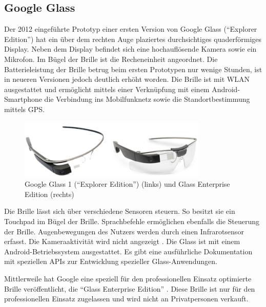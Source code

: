 \subsection{Google Glass}
\label{sec:Google_Glass}
Der 2012 eingeführte Prototyp einer ersten Version von Google Glass (\enquote{Explorer Edition}) hat ein über dem rechten Auge plaziertes durchsichtiges quaderförmiges Display. Neben dem Display befindet sich eine hochauflösende Kamera sowie ein Mikrofon. Im Bügel der Brille ist die Recheneinheit angeordnet. Die Batterieleistung der Brille betrug beim ersten Prototypen nur wenige Stunden, ist in neueren Versionen jedoch deutlich erhöht worden. Die Brille ist mit WLAN ausgestattet und ermöglicht mittels einer Verknüpfung mit einem Android-Smartphone die Verbindung ins Mobilfunknetz sowie die Standortbestimmung mittels GPS.
%
\begin{figure}[htbp]
    \centering
    \includegraphics[width=0.8\textwidth]{data/bilder/Glass_1_und_2.png}
    \caption{Google Glass 1 (\enquote{Explorer Edition}) \cite{Reckmann2014a} (links) und Glass Enterprise Edition \cite{Huvelin2017} (rechts)}
    \label{fig:GlassModel}
\end{figure}
%

Die Brille lässt sich über verschiedene Sensoren steuern. So besitzt sie ein Touchpad im Bügel der Brille. Sprachbefehle ermöglichen ebenfalls die Steuerung der Brille. Augenbewegungen des Nutzers werden durch einen Infrarotsensor erfasst. Die Kameraaktivität wird nicht angezeigt \cite[S.~30]{Schwenke2016}. Die Glass ist mit einem Android-Betriebssystem ausgestattet. Es gibt eine ausführliche Dokumentation mit speziellen APIs zur Entwicklung spezieller Glass-Anwendungen.

Mittlerweile hat Google eine speziell für den professionellen Einsatz optimierte Brille veröffentlicht, die \enquote{Glass Enterprise Edition} \cite{Inc.2018}. Diese Brille ist nur für den professionellen Einsatz zugelassen und wird nicht an Privatpersonen verkauft.
%
%
%
%
%
%
